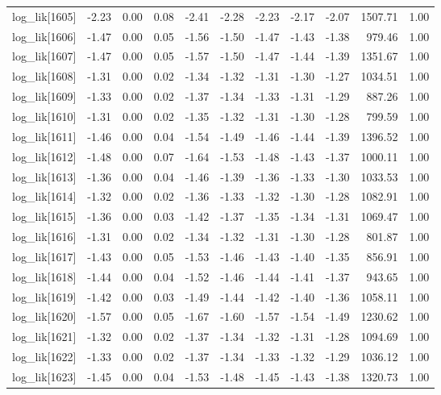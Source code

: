 \begin{table}[ht]
\begin{tabular}{rrrrrrrrrrr}
  log\_lik[1605] & -2.23 & 0.00 & 0.08 & -2.41 & -2.28 & -2.23 & -2.17 & -2.07 & 1507.71 & 1.00 \\ 
  log\_lik[1606] & -1.47 & 0.00 & 0.05 & -1.56 & -1.50 & -1.47 & -1.43 & -1.38 & 979.46 & 1.00 \\ 
  log\_lik[1607] & -1.47 & 0.00 & 0.05 & -1.57 & -1.50 & -1.47 & -1.44 & -1.39 & 1351.67 & 1.00 \\ 
  log\_lik[1608] & -1.31 & 0.00 & 0.02 & -1.34 & -1.32 & -1.31 & -1.30 & -1.27 & 1034.51 & 1.00 \\ 
  log\_lik[1609] & -1.33 & 0.00 & 0.02 & -1.37 & -1.34 & -1.33 & -1.31 & -1.29 & 887.26 & 1.00 \\ 
  log\_lik[1610] & -1.31 & 0.00 & 0.02 & -1.35 & -1.32 & -1.31 & -1.30 & -1.28 & 799.59 & 1.00 \\ 
  log\_lik[1611] & -1.46 & 0.00 & 0.04 & -1.54 & -1.49 & -1.46 & -1.44 & -1.39 & 1396.52 & 1.00 \\ 
  log\_lik[1612] & -1.48 & 0.00 & 0.07 & -1.64 & -1.53 & -1.48 & -1.43 & -1.37 & 1000.11 & 1.00 \\ 
  log\_lik[1613] & -1.36 & 0.00 & 0.04 & -1.46 & -1.39 & -1.36 & -1.33 & -1.30 & 1033.53 & 1.00 \\ 
  log\_lik[1614] & -1.32 & 0.00 & 0.02 & -1.36 & -1.33 & -1.32 & -1.30 & -1.28 & 1082.91 & 1.00 \\ 
  log\_lik[1615] & -1.36 & 0.00 & 0.03 & -1.42 & -1.37 & -1.35 & -1.34 & -1.31 & 1069.47 & 1.00 \\ 
  log\_lik[1616] & -1.31 & 0.00 & 0.02 & -1.34 & -1.32 & -1.31 & -1.30 & -1.28 & 801.87 & 1.00 \\ 
  log\_lik[1617] & -1.43 & 0.00 & 0.05 & -1.53 & -1.46 & -1.43 & -1.40 & -1.35 & 856.91 & 1.00 \\ 
  log\_lik[1618] & -1.44 & 0.00 & 0.04 & -1.52 & -1.46 & -1.44 & -1.41 & -1.37 & 943.65 & 1.00 \\ 
  log\_lik[1619] & -1.42 & 0.00 & 0.03 & -1.49 & -1.44 & -1.42 & -1.40 & -1.36 & 1058.11 & 1.00 \\ 
  log\_lik[1620] & -1.57 & 0.00 & 0.05 & -1.67 & -1.60 & -1.57 & -1.54 & -1.49 & 1230.62 & 1.00 \\ 
  log\_lik[1621] & -1.32 & 0.00 & 0.02 & -1.37 & -1.34 & -1.32 & -1.31 & -1.28 & 1094.69 & 1.00 \\ 
  log\_lik[1622] & -1.33 & 0.00 & 0.02 & -1.37 & -1.34 & -1.33 & -1.32 & -1.29 & 1036.12 & 1.00 \\ 
  log\_lik[1623] & -1.45 & 0.00 & 0.04 & -1.53 & -1.48 & -1.45 & -1.43 & -1.38 & 1320.73 & 1.00 \\ 

\end{tabular}
\end{table}
